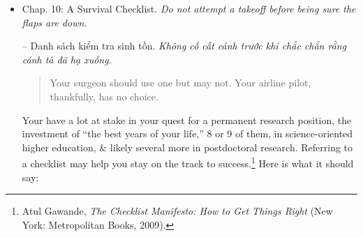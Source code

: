 \documentclass{article}
\begin{document}
\begin{enumerate}
\begin{itemize}
\begin{itemize}
			-- Không ai từng tiến xa hơn trong khoa học bằng cách tiết kiệm tiền. Ví dụ, trong lĩnh vực nghiên cứu của riêng tôi, những tiến bộ lớn về thuật toán đã giúp tính toán các đặc tính của chất rắn trong 1 phần nhỏ thời gian cần thiết trước đây. Điều này có nghĩa là mọi người đang yêu cầu ngân sách máy tính nhỏ hơn không? Không đời nào! Họ đã mở rộng quy mô của các vấn đề mà họ đề xuất để giải quyết. Họ đang yêu cầu những chiếc máy tính lớn hơn so với những chiếc máy tính hiện có \& nhiều thời gian sử dụng máy tính hơn.

			Ambition is rewarded in scientific life. Lack of it leads to the exit. Let your management worry about pinching pennies. That is not your job. Let the people who pay the bills know you are scientifically alive not only by publishing exciting results but also by keeping up your requests for support.

			-- Tham vọng được đền đáp trong cuộc sống khoa học. Thiếu nó sẽ dẫn đến sự ra đi. Hãy để ban quản lý của bạn lo lắng về việc thắt chặt chi tiêu. Đó không phải là công việc của bạn. Hãy để những người trả hóa đơn biết rằng bạn vẫn còn sống trong khoa học không chỉ bằng cách công bố những kết quả thú vị mà còn bằng cách duy trì các yêu cầu hỗ trợ của bạn.
		\end{itemize}

		\item {\sf Chap. 10: A Survival Checklist.} {\it Do not attempt a takeoff before being sure the flaps are down.}

		-- {\sf Danh sách kiểm tra sinh tồn.} {\it Không cố cất cánh trước khi chắc chắn rằng cánh tà đã hạ xuống.}
		\begin{quote}
			Your surgeon should use one but may not. Your airline pilot, thankfully, has no choice.
		\end{quote}
		Your have a lot at stake in your quest for a permanent research position, the investment of ``the best years of your life,'' 8 or 9 of them, in science-oriented higher education, \& likely several more in postdoctoral research. Referring to a checklist may help you stay on the track to success.\footnote{{\sc Atul Gawande}, {\it The Checklist Manifesto: How to Get Things Right} (New York: Metropolitan Books, 2009).} Here is what it should say:


\end{itemize}
\end{enumerate}
\end{document}
